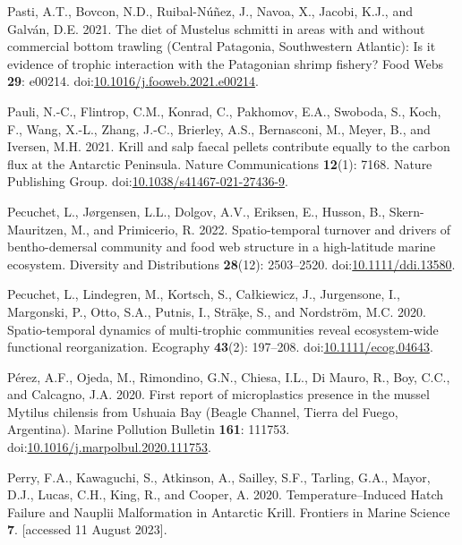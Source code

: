 \documentclass[
]{article}
\newlength{\cslhangindent}
\newenvironment{CSLReferences}[2] %
 {\begin{list}{}{%
  \setlength{\itemindent}{0pt}
  \setlength{\leftmargin}{0pt}
  \setlength{\parsep}{0pt}
  \ifodd #1
   \setlength{\leftmargin}{\cslhangindent}
   \setlength{\itemindent}{-1\cslhangindent}
  \fi
  \setlength{\itemsep}{#2\baselineskip}}}
 {\end{list}}
\begin{document}
\begin{CSLReferences}{1}{0}
Pasti, A.T., Bovcon, N.D., Ruibal-Núñez, J., Navoa, X., Jacobi, K.J.,
and Galván, D.E. 2021. The diet of {Mustelus} schmitti in areas with and
without commercial bottom trawling ({Central Patagonia}, {Southwestern
Atlantic}): {Is} it evidence of trophic interaction with the
{Patagonian} shrimp fishery? Food Webs \textbf{29}: e00214.
doi:\href{https://doi.org/10.1016/j.fooweb.2021.e00214}{10.1016/j.fooweb.2021.e00214}.

Pauli, N.-C., Flintrop, C.M., Konrad, C., Pakhomov, E.A., Swoboda, S.,
Koch, F., Wang, X.-L., Zhang, J.-C., Brierley, A.S., Bernasconi, M.,
Meyer, B., and Iversen, M.H. 2021. Krill and salp faecal pellets
contribute equally to the carbon flux at the {Antarctic Peninsula}.
Nature Communications \textbf{12}(1): 7168. Nature Publishing Group.
doi:\href{https://doi.org/10.1038/s41467-021-27436-9}{10.1038/s41467-021-27436-9}.

Pecuchet, L., Jørgensen, L.L., Dolgov, A.V., Eriksen, E., Husson, B.,
Skern-Mauritzen, M., and Primicerio, R. 2022. Spatio-temporal turnover
and drivers of bentho-demersal community and food web structure in a
high-latitude marine ecosystem. Diversity and Distributions
\textbf{28}(12): 2503--2520.
doi:\href{https://doi.org/10.1111/ddi.13580}{10.1111/ddi.13580}.

Pecuchet, L., Lindegren, M., Kortsch, S., Całkiewicz, J., Jurgensone,
I., Margonski, P., Otto, S.A., Putnis, I., Strāķe, S., and Nordström,
M.C. 2020. Spatio-temporal dynamics of multi-trophic communities reveal
ecosystem-wide functional reorganization. Ecography \textbf{43}(2):
197--208.
doi:\href{https://doi.org/10.1111/ecog.04643}{10.1111/ecog.04643}.

Pérez, A.F., Ojeda, M., Rimondino, G.N., Chiesa, I.L., Di Mauro, R.,
Boy, C.C., and Calcagno, J.A. 2020. First report of microplastics
presence in the mussel {Mytilus} chilensis from {Ushuaia Bay} ({Beagle
Channel}, {Tierra} del {Fuego}, {Argentina}). Marine Pollution Bulletin
\textbf{161}: 111753.
doi:\href{https://doi.org/10.1016/j.marpolbul.2020.111753}{10.1016/j.marpolbul.2020.111753}.

Perry, F.A., Kawaguchi, S., Atkinson, A., Sailley, S.F., Tarling, G.A.,
Mayor, D.J., Lucas, C.H., King, R., and Cooper, A. 2020.
Temperature--{Induced Hatch Failure} and {Nauplii Malformation} in
{Antarctic Krill}. Frontiers in Marine Science \textbf{7}. {[}accessed
11 August 2023{]}.


\end{CSLReferences}
\end{document}
